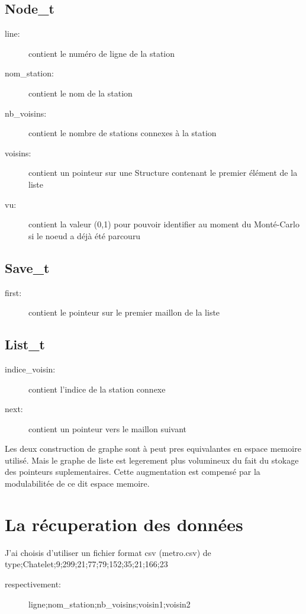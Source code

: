 \documentclass[12pt, twoside]{report}
\begin{document}
\subsection{Node\_t}
\begin{description}
\item[line:] contient le numéro de ligne de la station
\item[nom\_station:] contient le nom de la station
\item[nb\_voisins:] contient le nombre de stations connexes à la station
\item[voisins:] contient un pointeur sur une Structure contenant le premier élément de la liste
\item[vu:] contient la valeur (0,1) pour pouvoir identifier au moment du Monté-Carlo si le noeud a déjà été parcouru
\end{description}

\subsection{Save\_t}
\begin{description}
\item[first:] contient le pointeur sur le premier maillon de la liste
\end{description}


\subsection{List\_t}
\begin{description}
\item[indice\_voisin:] contient l'indice de la station connexe
\item[next:] contient un pointeur vers le maillon suivant
\end{description}

Les deux construction de graphe sont à peut pres equivalantes en espace memoire utilisé.
Mais le graphe de liste est legerement plus volumineux du fait du stokage des pointeurs suplementaires.
Cette augmentation est compensé par la modulabilitée de ce dit espace memoire.


\section{La récuperation des données}
J'ai choisis d'utiliser un fichier format csv (metro.csv) de type;Chatelet;9;299;21;77;79;152;35;21;166;23\newline
\begin{description}
\item[respectivement:] ligne;nom\_station;nb\_voisins;voisin1;voisin2
\end{description}
\end{document}
